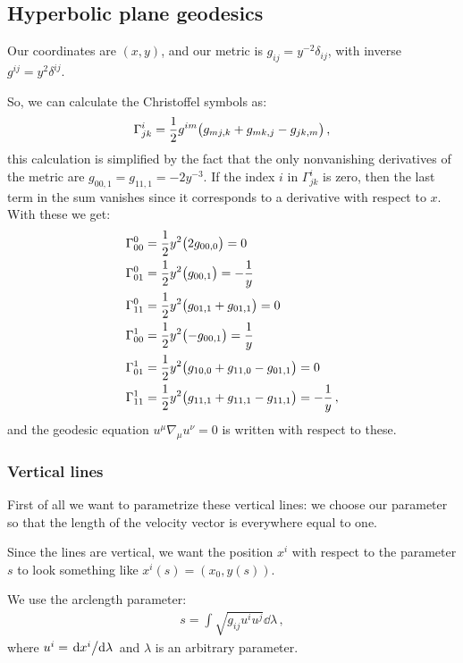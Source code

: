 \documentclass[main.tex]{subfiles}
\begin{document}
\subsection{Hyperbolic plane geodesics}

Our coordinates are \((x, y)\), and our metric is \(g_{ij } = y^{-2} \delta_{ij }\), with inverse \(g^{ij} = y^2 \delta^{ij}\).

So, we can calculate the Christoffel symbols as: 
%
\begin{align}
  \Gamma^{i}_{jk} = \frac{1}{2} g^{im} \qty(g_{mj,k} + g_{m k, j } - g_{jk,m})
\,,
\end{align}
%
this calculation is simplified by the fact that the only nonvanishing derivatives of the metric are \(g_{00,1}=g_{11,1} = -2 y^{-3} \). If the index \(i\) in \(\Gamma^{i}_{jk}\) is zero, then the last term in the sum vanishes since it corresponds to a derivative with respect to \(x\).
With these we get: 
%
\begin{subequations}
\begin{align}
  \Gamma^{0}_{00} &=  \frac{1}{2} y^2 \qty(2g_{00,0})= 0 \\
  \Gamma^{0}_{01} &=  \frac{1}{2} y^2 \qty(g_{00,1})= - \frac{1}{y}  \\
  \Gamma^{0}_{11} &=  \frac{1}{2} y^2 \qty(g_{01,1} + g_{01,1})= 0  \\
  \Gamma^{1}_{00} &=  \frac{1}{2} y^2 \qty(- g_{00,1})= \frac{1}{y}  \\
  \Gamma^{1}_{01} &=  \frac{1}{2} y^2 \qty(g_{10,0} + g_{11,0} - g_{01,1})= 0   \\
  \Gamma^{1}_{11} &=  \frac{1}{2} y^2 \qty(g_{11,1}+g_{11,1}-g_{11,1})= -\frac{1}{y}  
\,,
\end{align}
\end{subequations}
%
and the geodesic equation \(u^{\mu } \nabla_{\mu } u^{\nu }= 0 \) is written with respect to these.

\subsubsection{Vertical lines}

First of all we want to parametrize these vertical lines: we choose our parameter so that the length of the velocity vector is everywhere equal to one.

Since the lines are vertical, we want the position \(x^{i}\) with respect to the parameter \(s\) to look something like \(x^{i}(s) = (x_0, y(s))\).

We use the arclength parameter: 
%
\begin{align}
  s = \int \sqrt{g_{ij} u^{i} u^{j}} \dd{\lambda }
\,,
\end{align}
%
where \(u^{i} = \dv*{x^{i}}{\lambda }\) and \(\lambda \) is an arbitrary parameter.
\end{document}
